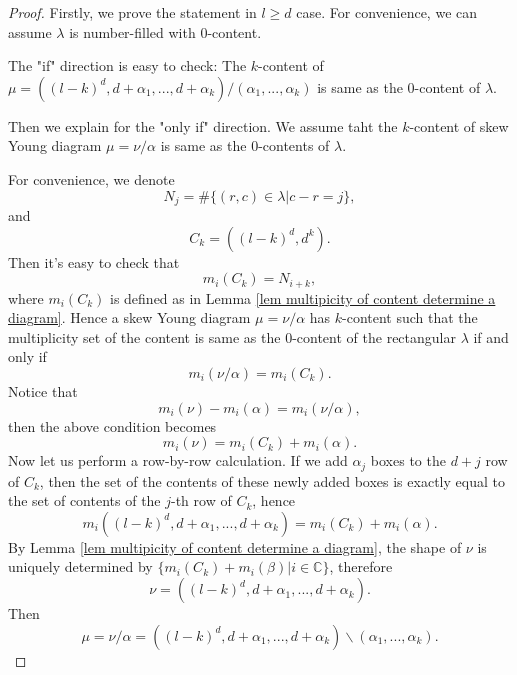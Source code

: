 \documentclass[11pt]{amsart}
\numberwithin{equation}{section}
\theoremstyle{definition}
\begin{document}
\begin{proof}
    Firstly, we prove the statement in $l\geq d$ case.  For convenience, we can assume $\lambda$ is number-filled with $0$-content.
     
    The "if" direction is easy to check: The $k$-content of $\mu=((l-k)^{d}, d+\alpha_{1},...,d+\alpha_{k})/(\alpha_{1},...,\alpha_{k})$ is same as the $0$-content of $\lambda$.

    Then we explain for the "only if" direction. We assume taht the $k$-content of skew Young diagram $\mu=\nu/\alpha$  is same as the $0$-contents of $\lambda$.
    
    For convenience, we denote
    \[
     N_j=\#\{(r,c)\in\lambda|c-r=j\},
    \]
    and
    \[
    C_{k}=((l-k)^d,d^k).
    \]
    Then it's easy to check that 
    \[
    m_i(C_k)=N_{i+k},
    \]
    where $m_i(C_k)$ is defined as in Lemma \ref{lem multipicity of content determine a diagram}. Hence a skew Young diagram $\mu=\nu/\alpha$ has $k$-content such that the multiplicity set of the content is same as the $0$-content of the rectangular $\lambda$ if and only if
    \[
    m_i(\nu/\alpha)=m_{i}(C_k).
    \]
    Notice that 
    \[
    m_i(\nu)-m_i(\alpha)=m_i(\nu/\alpha),
    \]
    then the above condition becomes
    \[
    m_i(\nu)=m_{i}(C_k)+m_i(\alpha).
    \]
    Now let us perform a row-by-row calculation. If we add $\alpha_{j}$ boxes to the $d+j$ row of $C_k$, then the set of the contents of these newly added boxes is exactly equal to the set of contents of the $j$-th row of $C_k$, hence
    \[
    m_i((l-k)^d,d+\alpha_1,...,d+\alpha_k)=m_{i}(C_k)+m_i(\alpha).
    \]
    By Lemma \ref{lem multipicity of content determine a diagram}, the shape of $\nu$ is uniquely determined by $\{m_{i}(C_k)+m_i(\beta)|i\in\mathbb{C}\}$, therefore
    \[
    \nu=((l-k)^{d}, d+\alpha_{1},...,d+\alpha_{k}).
    \]
     Then 
     \[
     \mu=\nu/\alpha=((l-k)^{d}, d+\alpha_{1},...,d+\alpha_{k})\backslash(\alpha_{1},...,\alpha_{k}).
     \]
    

\end{proof}
\end{document}
